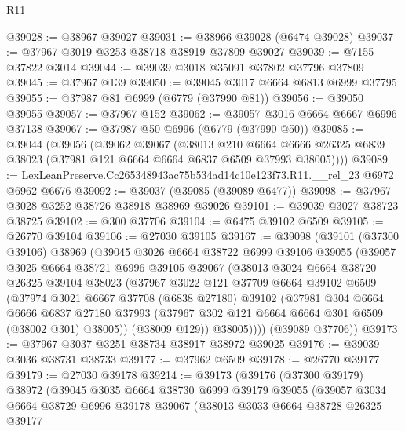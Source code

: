 \begin{lexlean}{R11}
\begin{coremodule}
@39028 := @38967 @39027
@39031 := @38966 @39028 (@6474 @39028)
@39037 := @37967 @3019 @3253 @38718 @38919 @37809 @39027
@39039 := @7155 @37822 @3014
@39044 := @39039 @3018 @35091 @37802 @37796 @37809
@39045 := @37967 @139
@39050 := @39045 @3017 @6664 @6813 @6999 @37795
@39055 := @37987 @81 @6999 (@6779 (@37990 @81))
@39056 := @39050 @39055
@39057 := @37967 @152
@39062 := @39057 @3016 @6664 @6667 @6996 @37138
@39067 := @37987 @50 @6996 (@6779 (@37990 @50))
@39085 := @39044
    (@39056
      (@39062
        @39067
        (@38013
          @210
          @6664
          @6666
          @26325
          @6839
          @38023
          (@37981 @121 @6664 @6664 @6837 @6509 @37993 @38005))))
@39089 := LexLeanPreserve.Cc265348943ac75b534ad14c10e123f73.R11.__rel_23 @6972 @6962 @6676
@39092 := @39037 (@39085 (@39089 @6477))
@39098 := @37967 @3028 @3252 @38726 @38918 @38969 @39026
@39101 := @39039 @3027 @38723 @38725
@39102 := @300 @37706
@39104 := @6475 @39102 @6509
@39105 := @26770 @39104
@39106 := @27030 @39105
@39167 := @39098
    (@39101
      (@37300 @39106)
      @38969
      (@39045
        @3026
        @6664
        @38722
        @6999
        @39106
        @39055
        (@39057
          @3025
          @6664
          @38721
          @6996
          @39105
          @39067
          (@38013
            @3024
            @6664
            @38720
            @26325
            @39104
            @38023
            (@37967
              @3022
              @121
              @37709
              @6664
              @39102
              @6509
              (@37974
                @3021
                @6667
                @37708
                (@6838 @27180)
                @39102
                (@37981
                  @304
                  @6664
                  @6666
                  @6837
                  @27180
                  @37993
                  (@37967 @302 @121 @6664 @6664 @301 @6509 (@38002 @301) @38005))
                (@38009 @129))
              @38005))))
      (@39089 @37706))
@39173 := @37967 @3037 @3251 @38734 @38917 @38972 @39025
@39176 := @39039 @3036 @38731 @38733
@39177 := @37962 @6509
@39178 := @26770 @39177
@39179 := @27030 @39178
@39214 := @39173
    (@39176
      (@37300 @39179)
      @38972
      (@39045
        @3035
        @6664
        @38730
        @6999
        @39179
        @39055
        (@39057
          @3034
          @6664
          @38729
          @6996
          @39178
          @39067
          (@38013
            @3033
            @6664
            @38728
            @26325
            @39177

\end{coremodule}
\end{lexlean}
